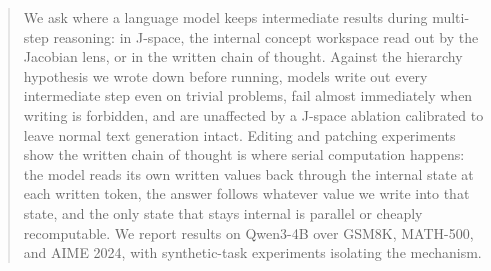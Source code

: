 \documentclass{article}
\begin{document}
\printAffiliationsAndNotice{}
\begin{abstract}
We ask where a language model keeps intermediate results during multi-step reasoning: in J-space, the internal concept workspace read out by the Jacobian lens, or in the written chain of thought. Against the hierarchy hypothesis we wrote down before running, models write out every intermediate step even on trivial problems, fail almost immediately when writing is forbidden, and are unaffected by a J-space ablation calibrated to leave normal text generation intact. Editing and patching experiments show the written chain of thought is where serial computation happens: the model reads its own written values back through the internal state at each written token, the answer follows whatever value we write into that state, and the only state that stays internal is parallel or cheaply recomputable. We report results on Qwen3-4B over GSM8K, MATH-500, and AIME 2024, with synthetic-task experiments isolating the mechanism.
\end{abstract}

\end{document}
